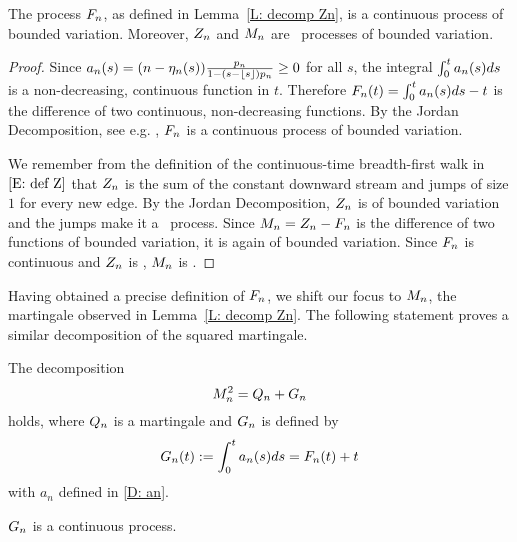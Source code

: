\begin{corollary}
	The process $F_n$, as defined in Lemma~\ref{L: decomp Zn}, is a continuous process of bounded variation.
	Moreover, $Z_n$ and $M_n$ are \cadlag~processes of bounded variation.
\end{corollary}

\begin{proof}
	Since $a_n(s) = (n - \eta_n(s)) \frac{p_n}{1-(s-\lfloor s\rfloor)p_n} \geq 0$ for all $s$,
	the integral $\int_{0}^{t}a_n(s)ds$ is a non-decreasing, continuous function in $t$.
	Therefore $F_n(t) = \int_{0}^{t}a_n(s)ds -t$ is the difference of two continuous, non-decreasing functions.
	By the Jordan Decomposition, see e.g. \cite[Proposition 22, p.236]{Royden.1969}, $F_n$ is a continuous process of bounded variation.
	
	We remember from the definition of the continuous-time breadth-first walk in $\eqref{E: def Z}$
	that $Z_n$ is the sum of the constant downward stream and jumps of size $1$ for every new edge.
	By the Jordan Decomposition, $Z_n$ is of bounded variation and the jumps make it a \cadlag~process.
	Since $M_n = Z_n - F_n$ is the difference of two functions of bounded variation, 
	it is again of bounded variation.
	Since $F_n$ is continuous and $Z_n$ is \cadlag, $M_n$ is \cadlag.
\end{proof}



Having obtained a precise definition of $F_n$, we shift our focus to $M_n$, the martingale observed in Lemma~\ref{L: decomp Zn}.
The following statement proves a similar decomposition of the squared martingale.

\begin{lemma} \label{L: decomp Mn}
	The decomposition
	\begin{equation} \label{E: decomp Mn}
	M_n^2 = Q_n + G_n
	\end{equation}
	holds, where $Q_n$ is a martingale and $G_n$ is defined by 
	\begin{equation} \label{D: Bn}
	G_n(t) := \int_{0}^{t} a_n(s)ds = F_n(t) + t
	\end{equation}
	with $a_n$ defined in \eqref{D: an}.
\end{lemma}
\begin{note} \label{N: decomp Mn}
	$G_n$ is a continuous process.
\end{note}

